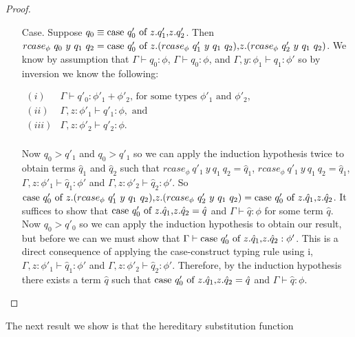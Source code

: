 \begin{proof}
\begin{itemize}
\begin{itemize}
\begin{itemize}
    \item[Case.] Suppose $q_0 \equiv \mbox{case}\ q'_0\ \text{of}\ z\text{.}q'_1\text{,}z\text{.}q'_2$.  Then \\
      $rcase_{\phi}\ q_0\ y\ q_1\ q_2 = \ccon{q'_0}{z}{(rcase_{\phi}\ q'_1\ y\ q_1\ q_2)}{(rcase_{\phi}\ q'_2\ y\ q_1\ q_2)}$.
      We know by assumption that $\Gamma \vdash q_0:\phi$, $\Gamma \vdash q_0:\phi$, and $\Gamma, y:\phi_1 \vdash q_1:\phi'$
      so by inversion we know the following:
      \begin{center}
        \begin{math}
          \begin{array}{lll}
            (i) & \Gamma \vdash q'_0:\phi'_1 + \phi'_2 \text{, for some types } \phi'_1 \text{ and } \phi'_2,\\
            (ii) & \Gamma, z:\phi'_1 \vdash q'_1:\phi, \text{ and }\\
            (iii) & \Gamma, z:\phi'_2 \vdash q'_2:\phi.\\
          \end{array}
        \end{math}
      \end{center}
      Now $q_0 > q'_1$ and $q_0 > q'_1$ so we can apply the induction hypothesis twice to obtain terms $\hat{q}_1$ and
      $\hat{q}_2$ such that $rcase_{\phi}\ q'_1\ y\ q_1\ q_2 = \hat{q}_1$, $rcase_{\phi}\ q'_1\ y\ q_1\ q_2 = \hat{q}_1$,
      $\Gamma, z:\phi'_1 \vdash \hat{q}_1:\phi'$ and $\Gamma, z:\phi'_2 \vdash \hat{q}_2:\phi'$. So
      $\ccon{q'_0}{z}{(rcase_{\phi}\ q'_1\ y\ q_1\ q_2)}{(rcase_{\phi}\ q'_2\ y\ q_1\ q_2)} = 
      \ccon{q'_0}{z}{\hat{q}_1}{\hat{q}_2}$.  It suffices to show that $\mbox{case}\ q'_0\ \text{of}\ z\text{.}\hat{q}_1\text{,}z\text{.}\hat{q}_2 = \hat{q}$ 
      and $\Gamma \vdash \hat{q}:\phi$ for some term $\hat{q}$.  Now $q_0 > q'_0$ so we can apply the induction hypothesis
      to obtain our result, but before we can we must show that $\Gamma \vdash \mbox{case}\ q'_0\ \text{of}\ z\text{.}\hat{q}_1\text{,}z\text{.}\hat{q}_2:\phi'$.
      This is a direct consequence of applying the case-construct typing rule using i, $\Gamma, z:\phi'_1 \vdash \hat{q}_1:\phi'$
      and $\Gamma, z:\phi'_2 \vdash \hat{q}_2:\phi'$.  Therefore, by the induction hypothesis there exists a term $\hat{q}$ 
      such that $\mbox{case}\ q'_0\ \text{of}\ z\text{.}\hat{q}_1\text{,}z\text{.}\hat{q}_2 = \hat{q}$ and $\Gamma \vdash \hat{q}:\phi$.
    \end{itemize}
  \end{itemize}
\end{itemize}
\end{proof}
The next result we show is that the hereditary substitution function
